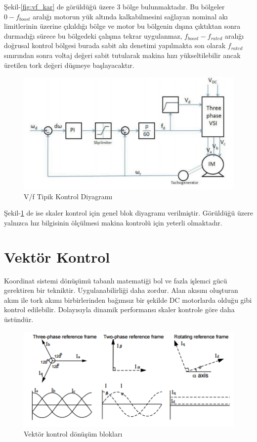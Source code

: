 \documentclass[10pt,a4paper]{article}
\begin{document}
	Şekil-\ref{fig:vf_kar} de görüldüğü üzere 3 bölge bulunmaktadır. Bu bölgeler $0-f_{boost}$ aralığı motorun yük altında kalkabilmesini sağlayan nominal akı limitlerinin üzerine çıkıldığı bölge ve motor bu bölgenin dışına çıktıktan sonra durmadığı sürece bu bölgedeki çalışma tekrar uygulanmaz, $f_{boost}-f_{rated}$ aralığı doğrusal kontrol bölgesi burada sabit akı denetimi yapılmakta son olarak $f_{rated}$ sınırından sonra voltaj değeri sabit tutularak makina hızı yükseltilebilir ancak üretilen tork değeri düşmeye başlayacaktır.

	\begin{figure}[hp]
		\centering	
		\shorthandoff{=}
		\includegraphics[width=1.0\linewidth]{vf_closed.png}
		\shorthandon{=}	
		\caption{V/f Tipik Kontrol Diyagramı}
		\label{fig:vf_kontrol}
	\end{figure}
	Şekil-\ref{fig:vf_kontrol} de ise skaler kontrol için genel blok diyagramı verilmiştir. Görüldüğü üzere yalnızca hız bilgisinin ölçülmesi makina kontrolü için yeterli olmaktadır.
	
	\section{Vektör Kontrol}
	Koordinat sistemi dönüşümü tabanlı matematiği bol ve fazla işlemci gücü gerektiren bir tekniktir. Uygulanabilirliği daha zordur. Alan akısını oluşturan akım ile tork akımı birbirlerinden bağımsız bir şekilde DC motorlarda olduğu gibi kontrol edilebilir. Dolayısıyla dinamik performansı skaler kontrole göre daha üstündür.
	
	\begin{figure}[hp]
		\centering	
		\shorthandoff{=}
		\includegraphics[width=0.7\linewidth]{clark_park.png}
		\shorthandon{=}	
		\caption{Vektör kontrol dönüşüm blokları}
		\label{fig:clark_park}
	\end{figure}
	
\end{document}
